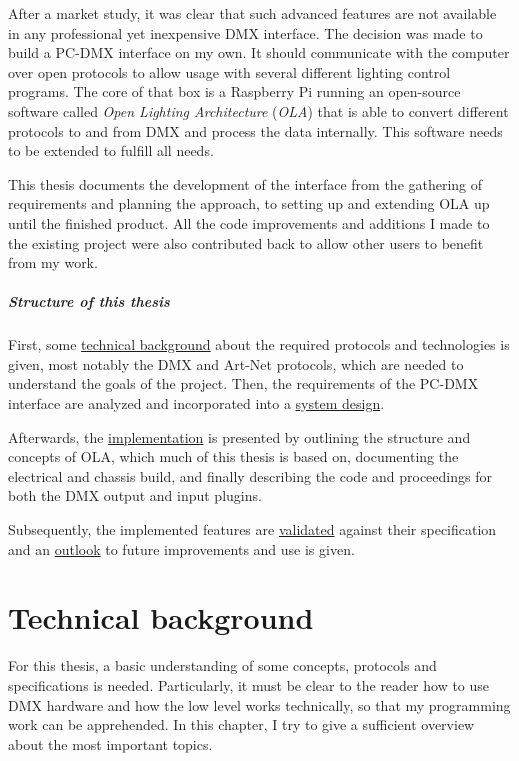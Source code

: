 After a market study, it was clear that such advanced features are not
available in any professional yet inexpensive DMX interface. The
decision was made to build a PC-DMX interface on my own. It should
communicate with the computer over open protocols to allow usage with
several different lighting control programs. The core of that box is a
Raspberry Pi running an open-source software called \emph{Open Lighting
Architecture} (\emph{OLA}) that is able to convert different protocols
to and from DMX and process the data internally. This software needs to
be extended to fulfill all needs.

This thesis documents the development of the interface from the
gathering of requirements and planning the approach, to setting up and
extending OLA up until the finished product. All the code improvements
and additions I made to the existing project were also contributed back
to allow other users to benefit from my work.

\paragraph{Structure of this thesis}\label{structure-of-this-thesis}

First, some \protect\hyperlink{sec:technical-background}{technical
background} about the required protocols and technologies is given, most
notably the DMX and Art-Net protocols, which are needed to understand
the goals of the project. Then, the requirements of the PC-DMX interface
are analyzed and incorporated into a
\protect\hyperlink{sec:system-design}{system design}.

Afterwards, the \protect\hyperlink{sec:implementation}{implementation}
is presented by outlining the structure and concepts of OLA, which much
of this thesis is based on, documenting the electrical and chassis
build, and finally describing the code and proceedings for both the DMX
output and input plugins.

Subsequently, the implemented features are
\protect\hyperlink{sec:testing}{validated} against their specification
and an \protect\hyperlink{sec:outlook}{outlook} to future improvements
and use is given.

\cleardoublepage\hypertarget{sec:technical-background}{\chapter{Technical
background}\label{sec:technical-background}}

For this thesis, a basic understanding of some concepts, protocols and
specifications is needed. Particularly, it must be clear to the reader
how to use DMX hardware and how the low level works technically, so that
my programming work can be apprehended. In this chapter, I try to give a
sufficient overview about the most important topics.

